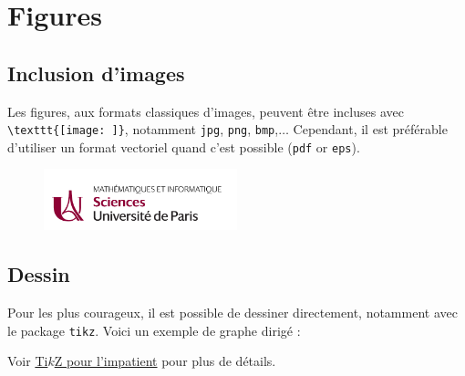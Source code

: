\documentclass[a4paper, 12pt]{report}
\begin{document}
    \section{Figures}
    \subsection{Inclusion d'images}
    Les figures, aux formats classiques d'images, peuvent être incluses avec \verb+\texttt{[image: ]}+, notamment \texttt{jpg}, \texttt{png}, \texttt{bmp},$\dots$ Cependant, il est préférable d'utiliser un format vectoriel quand c'est possible (\texttt{pdf} or \texttt{eps}).

    \begin{figure}[H]
        \centering
        \includegraphics[width=0.5\textwidth]{resources/img/up_maths-info.jpg}
        \label{fig:logo-up-mi}
    \end{figure}

    \subsection{Dessin}
    Pour les plus courageux, il est possible de dessiner directement, notamment avec le package \texttt{tikz}. Voici un exemple de graphe dirigé :
    
    \begin{figure}[H]
        \centering
        \label{fig:graphe-dirige}
    \end{figure}
    
    Voir \href{http://math.et.info.free.fr/TikZ/}{Ti$k$Z pour l'impatient} pour plus de détails.
\end{document}

